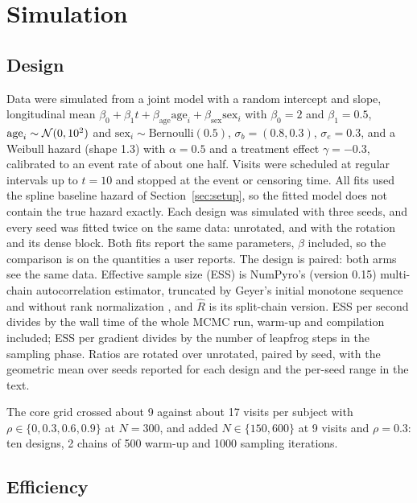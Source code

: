 \section{Simulation}\label{sec:simulation}

\subsection{Design}

Data were simulated from a joint model with a random intercept and slope,
longitudinal mean $\beta_0 + \beta_1 t + \beta_{\mathrm{age}}\mathrm{age}_i
+ \beta_{\mathrm{sex}}\mathrm{sex}_i$ with $\beta_0 = 2$ and $\beta_1 =
0.5$, $\mathrm{age}_i \sim \mathcal{N}(0, 10^2)$ and $\mathrm{sex}_i \sim
\mathrm{Bernoulli}(0.5)$, $\sigma_b = (0.8, 0.3)$, $\sigma_e = 0.3$, and a
Weibull hazard (shape 1.3) with $\alpha = 0.5$ and a treatment effect
$\gamma = -0.3$, calibrated to an event rate of about one half. Visits
were scheduled at regular intervals up to $t = 10$ and stopped at the event
or censoring time. All fits used the spline baseline hazard of
Section~\ref{sec:setup}, so the fitted model does not contain the true
hazard exactly. Each design was simulated with three seeds, and every seed
was fitted twice on the same data: unrotated, and with the rotation and
its dense block. Both fits report the same parameters, $\beta$ included,
so the comparison is on the quantities a user reports. The design is
paired: both arms see the same data. Effective sample size (ESS) is
NumPyro's (version 0.15) multi-chain autocorrelation estimator, truncated
by Geyer's initial monotone sequence and without rank normalization
\citep{geyer1992,gelman2013}, and $\hat R$ is its split-chain version. ESS
per second divides by the wall time of the whole MCMC run, warm-up and
compilation included; ESS per gradient divides by the number of leapfrog
steps in the sampling phase. Ratios are rotated over unrotated, paired by
seed, with the geometric mean over seeds reported for each design and the
per-seed range in the text.

The core grid crossed about 9 against about 17 visits per subject with
$\rho \in \{0, 0.3, 0.6, 0.9\}$ at $N = 300$, and added $N \in \{150,
600\}$ at 9 visits and $\rho = 0.3$: ten designs, 2 chains of 500 warm-up
and 1000 sampling iterations.

\subsection{Efficiency}

